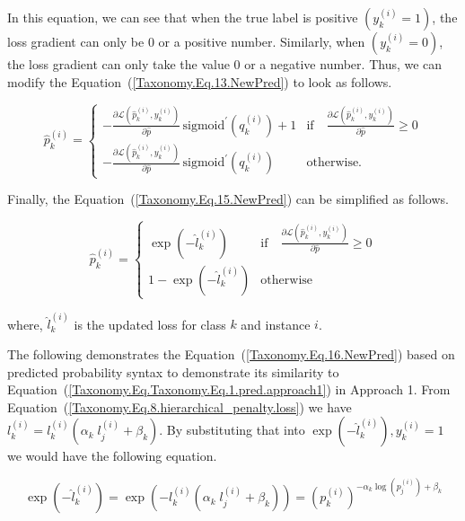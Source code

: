 \documentclass[preprint,3p,times, review]{elsarticle}
\begin{document}
In this equation, we can see that when the true label is positive $\left(y_k^{(i)}=1\right) $, the loss gradient can only be 0 or a positive number. Similarly, when $\left(y_k^{(i)}=0\right) $, the loss gradient can only take the value 0 or a negative number. Thus, we can modify the Equation~(\ref{Taxonomy.Eq.13.NewPred})  to look as follows.

\begin{equation}
    \label{Taxonomy.Eq.15.NewPred}
    \widehat{p}_k^{(i)} =
    \begin{cases}
        -\frac{\partial \mathcal{L}(\widehat{p}_k^{(i)}, y_k^{(i)})}{\partial \widehat{p}} \, \text{sigmoid}^{\prime}(q_k^{(i)}) + 1 & \text{if} \quad \frac{\partial \mathcal{L}(\widehat{p}_k^{(i)}, y_k^{(i)})}{\partial \widehat{p}} \geq 0 \\
        -\frac{\partial \mathcal{L}(\widehat{p}_k^{(i)}, y_k^{(i)})}{\partial \widehat{p}} \, \text{sigmoid}^{\prime}(q_k^{(i)}) & \text{otherwise.}
    \end{cases}
\end{equation}

Finally, the Equation~(\ref{Taxonomy.Eq.15.NewPred}) can be simplified as follows.



\begin{equation}
    \label{Taxonomy.Eq.16.NewPred}
    \widehat{p}_k^{(i)} =
    \begin{cases}
        \exp(-\widehat{l}_k^{(i)}) & \text{if} \quad \frac{\partial \mathcal{L}(\widehat{p}_k^{(i)}, y_k^{(i)})}{\partial \widehat{p}} \geq 0 \\
        1 - \exp(-\widehat{l}_k^{(i)}) & \text{otherwise}
    \end{cases}
\end{equation}

where, ${\widehat l}_k^{(i)} $ is the updated loss for class $k $ and instance $i $.

The following demonstrates the Equation~(\ref{Taxonomy.Eq.16.NewPred})  based on predicted probability syntax to demonstrate its similarity to Equation~(\ref{Taxonomy.Eq.Taxonomy.Eq.1.pred.approach1})  in Approach 1. From Equation~(\ref{Taxonomy.Eq.8.hierarchical_penalty.loss}) we have $l_k^{(i)}=l_k^{(i)}\left(\alpha_k\;l_j^{(i)}+\beta_k\right) $. By substituting that into $\exp{\left(-\widehat{l}_{k}^{(i)}\right)}, y_{k}^{(i)}=1 $ we would have the following equation.


\begin{equation}
    \label{Taxonomy.Eq.17}
    \exp{\left(-{\widehat l}_k^{(i)}\right)}=\exp{\left(-l_k^{(i)}\left(\alpha_k\;l_j^{(i)}+\beta_k\right)\right)}={\left(p_k^{(i)}\right)}^{-\alpha_k{\log{\left(p_j^{(i)}\right)}}+\beta_k}
\end{equation}
\end{document}
